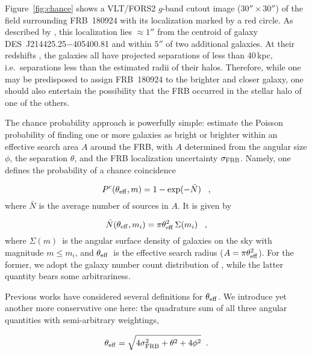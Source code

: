 \documentclass[twocolumn,linenumbers]{aastex63}
\newcommand{\mgmag}{m}
\newcommand{\gmag}{$\mgmag$}
\newcommand{\msigmafrb}{\sigma_{\rm FRB}} %
\newcommand{\sigmafrb}{$\msigmafrb$}
\newcommand{\msep}{\theta} %
\newcommand{\sep}{$\msep$}
\newcommand{\mhalflight}{\phi} %
\newcommand{\halflight}{$\mhalflight$}
\newcommand{\mtheff}{\theta_{\rm eff}} %
\newcommand{\theff}{$\mtheff$}
\newcommand{\mpchance}{P^c}
\newcommand{\mnumden}{\Sigma(\mgmag)}
\newcommand{\numden}{$\mnumden$}
\newcommand{\stcomment}[1]{\footnote{[SPT comment: {\color{purple} #1 }]}} %
\begin{document}
Figure~\ref{fig:chance} shows a VLT/FORS2 $g$-band
cutout image ($30'' \times 30''$)
of the field surrounding FRB~180924 with its localization
marked by a red circle.
As described by \cite{Bannister19}, this localization lies
$\approx 1''$ from the centroid of galaxy 
DES~J214425.25$-$405400.81 and 
within $5''$ of two additional galaxies.
At their redshifts \citep{Bannister19}, 
the galaxies all have projected separations of 
less than 40\,kpc, i.e.\ 
separations less than the estimated radii of their
halos.
Therefore, while one may be predisposed to assign 
FRB~180924 to the brighter and closer galaxy, one
should also entertain the possibility that the FRB occurred in the 
stellar halo of one of the others.

The chance probability approach is powerfully simple:
estimate the Poisson probability of finding one or more 
galaxies as bright or brighter within an effective
search area $A$ around the FRB, with $A$ determined from the 
angular size \halflight, 
the separation \sep, and the 
FRB localization uncertainty \sigmafrb.
Namely, one defines the probability of a chance
coincidence 

\begin{equation}
  \mpchance(\mtheff, \mgmag)  = 1 - \exp(-\bar N) \;\;\; ,
\label{eqn:chance}
\end{equation}
where $\bar N$ is the average number of sources
in $A$. It is given by

\begin{equation}
\bar N(\mtheff, \mgmag_i)  = \pi \mtheff^2 \, \Sigma(\mgmag_i) \;\;\; ,
\label{eqn:avgN}
\end{equation}
where \numden\ is the angular surface density of 
galaxies on the sky with magnitude $\mgmag \le \mgmag_i$,
and \theff\ is the effective search radius ($A = \pi \mtheff^2$).
For the former, we adopt the galaxy number count distribution
of \cite{driver16},
while the latter quantity bears some arbitrariness.

Previous works have considered several definitions
for \theff.  We introduce yet another more conservative
one here: the quadrature sum of all three
angular quantities with semi-arbitrary weightings,

\begin{equation}
\mtheff = \sqrt{4 \msigmafrb^2 + \theta^2 + 4 \mhalflight^2} 
\;\; .
\label{eqn:theta_eff}
\end{equation}
\end{document}
